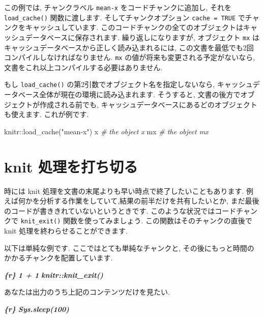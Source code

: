 \documentclass[
  11pt,
  lualatex,ja=standard,jafont=noto]{bxjsreport}
\newenvironment{Shaded}{\begin{snugshade}}{\end{snugshade}}
\newcommand{\CommentTok}[1]{\textcolor[rgb]{0.56,0.35,0.01}{\textit{#1}}}
\newcommand{\FunctionTok}[1]{\textcolor[rgb]{0.00,0.00,0.00}{#1}}
\newcommand{\InformationTok}[1]{\textcolor[rgb]{0.56,0.35,0.01}{\textbf{\textit{#1}}}}
\newcommand{\NormalTok}[1]{#1}
\newcommand{\SpecialCharTok}[1]{\textcolor[rgb]{0.00,0.00,0.00}{#1}}
\newcommand{\StringTok}[1]{\textcolor[rgb]{0.31,0.60,0.02}{#1}}
\begin{document}
この例では, チャンクラベル \texttt{mean-x} をコードチャンクに追加し, それを \texttt{load\_cache()} 関数に渡します. そしてチャンクオプション \texttt{cache = TRUE} でチャンクをキャッシュしています. このコードチャンクの全てのオブジェクトはキャッシュデータベースに保存されます. 繰り返しになりますが, オブジェクト \texttt{mx} はキャッシュデータベースから正しく読み込まれるには, この文書を最低でも2回コンパイルしなければなりません. \texttt{mx} の値が将来も変更される予定がないなら, 文書をこれ以上コンパイルする必要はありません.

もし \texttt{load\_cache()} の第2引数でオブジェクト名を指定しないなら, キャッシュデータベース全体が現在の環境に読み込まれます. そうすると, 文書の後方でオブジェクトが作成される前でも, キャッシュデータベースにあるどのオブジェクトも使えます. これが例です.

\begin{Shaded}
\begin{Highlighting}[numbers=left,,]
\NormalTok{knitr}\SpecialCharTok{::}\FunctionTok{load\_cache}\NormalTok{(}\StringTok{"mean{-}x"}\NormalTok{)}
\NormalTok{x  }\CommentTok{\# the object \textasciigrave{}x\textasciigrave{}}
\NormalTok{mx  }\CommentTok{\# the object \textasciigrave{}mx\textasciigrave{}}
\end{Highlighting}
\end{Shaded}

\hypertarget{knit-exit}{%
\section{knit 処理を打ち切る}\label{knit-exit}}

時には knit 処理を文書の末尾よりも早い時点で終了したいこともあります. 例えば何かを分析する作業をしていて,結果の前半だけを共有したいとか, まだ最後のコードが書ききれていないというときです. このような状況ではコードチャンクで \texttt{knit\_exit()} 関数を使ってみましょう. この関数はそのチャンクの直後で knit 処理を終わらせることができます.

以下は単純な例です. ここではとても単純なチャンクと, その後にもっと時間のかかるチャンクを配置しています.

\begin{Shaded}
\begin{Highlighting}[]
\InformationTok{\textasciigrave{}\textasciigrave{}\textasciigrave{}\{r\}}
\InformationTok{1 + 1}
\InformationTok{knitr::knit\_exit()}
\InformationTok{\textasciigrave{}\textasciigrave{}\textasciigrave{}}

\NormalTok{あなたは出力のうち上記のコンテンツだけを見たい.}

\InformationTok{\textasciigrave{}\textasciigrave{}\textasciigrave{}\{r\}}
\InformationTok{Sys.sleep(100)}
\InformationTok{\textasciigrave{}\textasciigrave{}\textasciigrave{}}
\end{Highlighting}
\end{Shaded}
\end{document}
